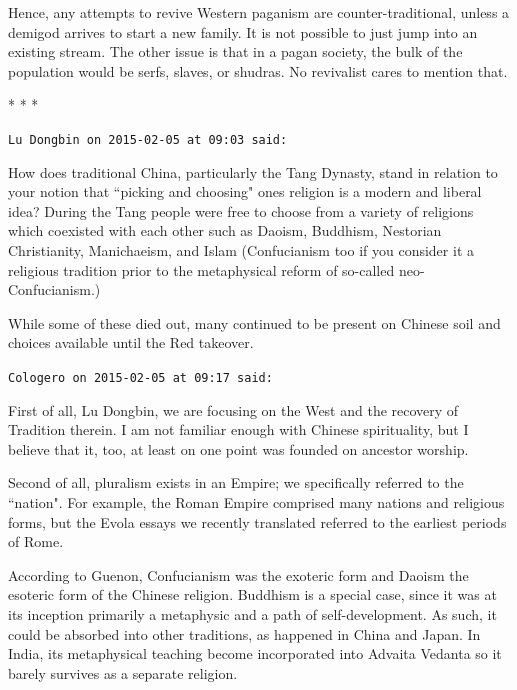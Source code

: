 Hence, any attempts to revive Western paganism are counter-traditional, unless a demigod arrives to start a new family. It is not possible to just jump into an existing stream. The other issue is that in a pagan society, the bulk of the population would be serfs, slaves, or shudras. No revivalist cares to mention that.




\begin{center}* * *\end{center}

\begin{footnotesize}\begin{sffamily}



\texttt{Lu Dongbin on 2015-02-05 at 09:03 said: }

How does traditional China, particularly the Tang Dynasty, stand in relation to your notion that ``picking and choosing" ones religion is a modern and liberal idea? During the Tang people were free to choose from a variety of religions which coexisted with each other such as Daoism, Buddhism, Nestorian Christianity, Manichaeism, and Islam (Confucianism too if you consider it a religious tradition prior to the metaphysical reform of so-called neo-Confucianism.)

While some of these died out, many continued to be present on Chinese soil and choices available until the Red takeover.


\hfill

\texttt{Cologero on 2015-02-05 at 09:17 said: }

First of all, Lu Dongbin, we are focusing on the West and the recovery of Tradition therein. I am not familiar enough with Chinese spirituality, but I believe that it, too, at least on one point was founded on ancestor worship.

Second of all, pluralism exists in an Empire; we specifically referred to the ``nation". For example, the Roman Empire comprised many nations and religious forms, but the Evola essays we recently translated referred to the earliest periods of Rome.

According to Guenon, Confucianism was the exoteric form and Daoism the esoteric form of the Chinese religion. Buddhism is a special case, since it was at its inception primarily a metaphysic and a path of self-development. As such, it could be absorbed into other traditions, as happened in China and Japan. In India, its metaphysical teaching become incorporated into Advaita Vedanta so it barely survives as a separate religion.


\end{sffamily}
\end{footnotesize}
